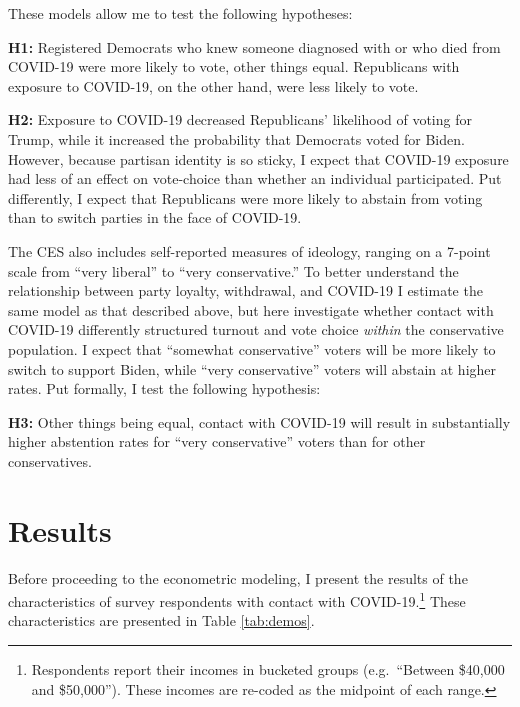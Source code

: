 \documentclass[
  12pt,
]{article}
\begin{document}
These models allow me to test the following hypotheses:

\textbf{H1:} Registered Democrats who knew someone diagnosed with or who died from COVID-19 were more likely to vote, other things equal. Republicans with exposure to COVID-19, on the other hand, were less likely to vote.

\textbf{H2:} Exposure to COVID-19 decreased Republicans' likelihood of voting for Trump, while it increased the probability that Democrats voted for Biden. However, because partisan identity is so sticky, I expect that COVID-19 exposure had less of an effect on vote-choice than whether an individual participated. Put differently, I expect that Republicans were more likely to abstain from voting than to switch parties in the face of COVID-19.

The CES also includes self-reported measures of ideology, ranging on a 7-point scale from ``very liberal'' to ``very conservative.'' To better understand the relationship between party loyalty, withdrawal, and COVID-19 I estimate the same model as that described above, but here investigate whether contact with COVID-19 differently structured turnout and vote choice \emph{within} the conservative population. I expect that ``somewhat conservative'' voters will be more likely to switch to support Biden, while ``very conservative'' voters will abstain at higher rates. Put formally, I test the following hypothesis:

\textbf{H3:} Other things being equal, contact with COVID-19 will result in substantially higher abstention rates for ``very conservative'' voters than for other conservatives.

\hypertarget{results}{%
\section*{Results}\label{results}}

Before proceeding to the econometric modeling, I present the results of the characteristics of survey respondents with contact with COVID-19.\footnote{Respondents report their incomes in bucketed groups (e.g.~``Between \$40,000 and \$50,000''). These incomes are re-coded as the midpoint of each range.} These characteristics are presented in Table \ref{tab:demos}.
\end{document}
